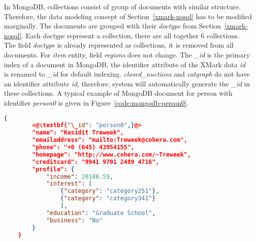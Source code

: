 In MongoDB, collections consist of group of documents with similar structure. Therefore, the data modeling concept of Section~\ref{xmark-nosql} has to be modified marginally. The documents are grouped with their \textit{doctype} from Section~\ref{xmark-nosql}. Each \textit{doctype} represent a collection, there are all together 6 collections. The field \textit{doctype} is already represented as collections, it is removed from all documents.  
For \textit{item} entity,  field \textit{regions} does not change. The \textit{\_id} is the primary index of a document in MongoDB, the identifier attribute of the XMark data \textit{id} is renamed to \textit{\_id} for default indexing.  \textit{closed\_auctions} and \textit{catgraph} do not have an identifier attribute \textit{id}, therefore, system will automatically generate the \textit{\_id} in these collections.
A typical example of MongoDB document for person with identifier \textit{person0} is given in Figure~\ref{code:mongodb-person0}.	

\newbox\mongodbXmarkDocument
\begin{lrbox}{\mongodbXmarkDocument}
\begin{lstlisting}[language=JSON, basicstyle =\scriptsize]
    {
    	<@\textbf{"\_id": "person0",}@>
    	"name": "Kasidit Treweek",
    	"emailaddress": "mailto:Treweek@cohera.com",
    	"phone": "+0 (645) 43954155",
    	"homepage": "http://www.cohera.com/~Treweek",
    	"creditcard": "9941 9701 2489 4716",
    	"profile": {
    		"income": 20186.59,
    		"interest": [
    			{"category": "category251"},
    			{"category": "category341"}
    			],
    		"education": "Graduate School",
    		"business": "No"
    	}
    }
\end{lstlisting}
\end{lrbox}


\newbox\mongodbXmarkChart
\begin{lrbox}{\mongodbXmarkChart}
\end{lrbox}

